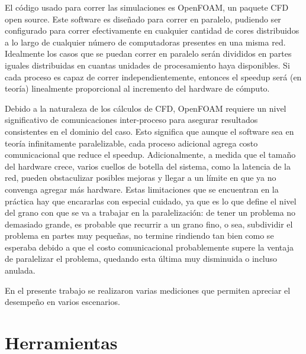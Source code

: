 \documentclass{article}
\begin{document}
El código usado para correr las simulaciones es OpenFOAM, un paquete CFD open source. Este software es diseñado para correr en paralelo, pudiendo ser configurado para correr efectivamente en cualquier cantidad de cores distribuidos a lo largo de cualquier número de computadoras presentes en una misma red. Idealmente los casos que se puedan correr en paralelo serán divididos en partes iguales distribuidas en cuantas unidades de procesamiento haya disponibles. Si cada proceso es capaz de correr independientemente, entonces el speedup será (en teoría) linealmente proporcional al incremento del hardware de cómputo. 

Debido a la naturaleza de los cálculos de CFD, OpenFOAM requiere un nivel significativo de comunicaciones inter-proceso para asegurar resultados consistentes en el dominio del caso. Esto significa que aunque el software sea en teoría infinitamente paralelizable, cada proceso adicional agrega costo comunicacional que reduce el speedup. Adicionalmente, a medida que el tamaño del hardware crece, varios cuellos de botella del sistema, como la latencia de la red, pueden obstaculizar posibles mejoras y llegar a un límite en que ya no convenga agregar más hardware. Estas limitaciones que se encuentran en la práctica hay que encararlas con especial cuidado, ya que es lo que define el nivel del grano con que se va a trabajar en la paralelización: de tener un problema no demasiado grande, es probable que recurrir a un grano fino, o sea, subdividir el problema en partes muy pequeñas, no termine rindiendo tan bien como se esperaba debido a que el costo comunicacional probablemente supere la ventaja de paralelizar el problema, quedando esta última muy disminuida o incluso anulada. 

En el presente trabajo se realizaron varias mediciones que permiten apreciar el desempeño en varios escenarios.

\newpage
\section{Herramientas}
\end{document}
